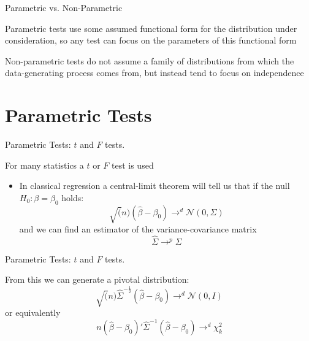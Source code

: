 \documentclass{beamer}
\begin{document}
\begin{frame}{Parametric vs. Non-Parametric}
	\begin{card}
        Parametric tests use some assumed functional form for the distribution under consideration, so any test can focus on the parameters of this functional form
    \end{card}
    \begin{card} Non-parametric tests do not assume a family of distributions from which the data-generating process comes from, but instead tend to focus on independence
	\end{card}
\end{frame}

\section{Parametric Tests}
\begin{frame}{Parametric Tests: $t$ and $F$ tests.}
	\begin{card}
For many statistics a $t$ or $F$ test is used
        \begin{itemize}
    		\item In classical regression a central-limit theorem will tell us that if the null $H_0:\beta=\beta_0$ holds:
    		$$\sqrt(n)(\hat{\beta}-\beta_0)\longrightarrow^{d} \mathcal{N}(0,\Sigma)$$
    		and we can find an estimator of the variance-covariance matrix
    		$$\hat{\Sigma}\longrightarrow^{p} \Sigma $$
    	\end{itemize}
    \end{card}

\end{frame}

\begin{frame}{Parametric Tests: $t$ and $F$ tests.}
	\begin{card}
From this we can generate a pivotal distribution:
			$$\sqrt(n)\hat{\Sigma}^{-\frac{1}{2}}(\hat{\beta}-\beta_0)\longrightarrow^{d} \mathcal{N}(0,I)$$
			or equivalently
			$$n(\hat{\beta}-\beta_0)'\hat{\Sigma}^{-1}(\hat{\beta}-\beta_0)\longrightarrow^{d}\chi^2_k$$
	\end{card}
\end{frame}
\end{document}
